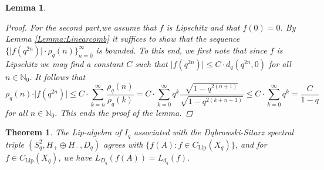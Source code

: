 \documentclass[11pt, reqno, a4paper, final]{amsart}
\theoremstyle{plain}
\newtheorem{theorem}{Theorem}[section]
\newtheorem{lemma}[thm]{Lemma}
\theoremstyle{definition}
\newcommand{\NN}{{\mathbb N}}
\renewcommand{\leq}{\leqslant}
\newcommand{\Lip}{\operatorname{Lip}}
\newcommand{\black}{\color{black}}
\begin{document}
\begin{lemma}
\begin{proof}
For the second part,{\black we assume that $f$ is Lipschitz and that $f(0) = 0$}. By Lemma \ref{Lemma:Linearcomb} it suffices to show that {\black the sequence $\lbrace\vert f(q^{2n}) \vert \cdot \rho_q(n) \rbrace_{n = 0}^\infty$} is bounded. To this end, we first note that since $f$ is Lipschitz we may find a constant $C$ such that $\vert f(q^{2n}) \vert \leq C\cdot d_q(q^{2n},0)$ for all $n\in \NN_0$. It follows that
\[
\rho_q(n) \cdot \vert f(q^{2n}) \vert \leq C\cdot \sum_{k=n}^\infty \frac{\rho_q(n)}{\rho_q(k)}= C \cdot \sum_{k=0}^\infty q^k\frac{ \sqrt{1-q^{2(n+1)}}}{\sqrt{1-q^{2(k+n+1)}}} \leq C \cdot \sum_{k=0}^\infty q^k = \frac{C}{1-q}
\]
for all $n\in \NN_0$. {\black This ends the proof of the lemma.} \end{proof} %
\end{lemma}

\begin{theorem}\label{Thm:Lip-identification}
The Lip-algebra of $I_q$ associated with the {\black Dąbrowski-Sitarz spectral triple $(S_q^2,H_+ \oplus H_-,D_q)$} agrees with $\lbrace f(A) : f\in C_{\Lip}(X_q) \rbrace$, and for $f\in C_{\Lip}(X_q)$, we have $L_{D_q}(f(A))=L_{d_q}(f)$.
\end{theorem}
\end{document}
